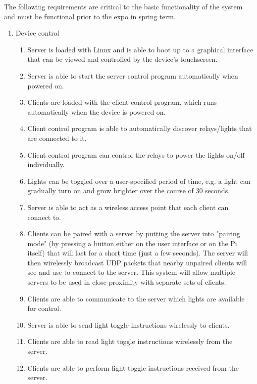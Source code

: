 \documentclass[12pt]{article}
\begin{document}
The following requirements are critical to the basic functionality of the
system and must be functional prior to the expo in spring term.

\begin{enumerate}
    \item Device control
        \begin{enumerate}
            \item Server is loaded with Linux and is able to boot up to a graphical interface that can be viewed and controlled by the device's touchscreen.
            \item Server is able to start the server control program automatically when powered on.
            \item Clients are loaded with the client control program, which runs automatically when the device is powered on.
            \item Client control program is able to automatically discover relays/lights that are connected to it.
            \item Client control program can control the relays to power the lights on/off individually.
            \item Lights can be toggled over a user-specified period of time, e.g. a light can gradually turn on and grow brighter over the course of 30 seconds.
            \item Server is able to act as a wireless access point that each client can connect to.
            \item Clients can be paired with a server by putting the server into "pairing mode" (by pressing a button either on the user interface or on the Pi itself) that will last for a short time (just a few seconds). The server will then wirelessly broadcast UDP packets that nearby unpaired clients will see and use to connect to the server. This system will allow multiple servers to be used in close proximity with separate sets of clients.
            \item Clients are able to communicate to the server which lights are available for control.
            \item Server is able to send light toggle instructions wirelessly to clients.
            \item Clients are able to read light toggle instructions wirelessly from the server.
            \item Clients are able to perform light toggle instructions received from the server.
        \end{enumerate}


\end{enumerate}
\end{document}
